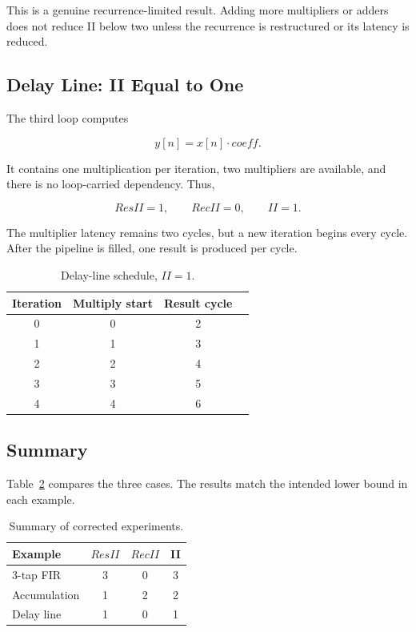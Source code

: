 \documentclass[conference]{IEEEtran}
\begin{document}
This is a genuine recurrence-limited result. Adding more multipliers or adders
does not reduce II below two unless the recurrence is restructured or its latency
is reduced.

\subsection{Delay Line: II Equal to One}

The third loop computes

\begin{equation}
y[n]=x[n]\cdot coeff .
\end{equation}

It contains one multiplication per iteration, two multipliers are available, and
there is no loop-carried dependency. Thus,

\begin{equation}
ResII=1,\qquad RecII=0,\qquad II=1.
\end{equation}

The multiplier latency remains two cycles, but a new iteration begins every cycle.
After the pipeline is filled, one result is produced per cycle.

\begin{table}[t]
\centering
\caption{Delay-line schedule, $II=1$.}
\label{tab:delay}
\begin{tabular}{@{}cccc@{}}
\toprule
Iteration & Multiply start & Result cycle\\
\midrule
0 & 0 & 2\\
1 & 1 & 3\\
2 & 2 & 4\\
3 & 3 & 5\\
4 & 4 & 6\\
\bottomrule
\end{tabular}
\end{table}

\subsection{Summary}

Table~\ref{tab:summary} compares the three cases. The results match the intended
lower bound in each example.


\begin{table}[t]
\centering
\caption{Summary of corrected experiments.}
\label{tab:summary}
\begin{tabular}{@{}lccc@{}}
\toprule
Example & $ResII$ & $RecII$ & II\\
\midrule
3-tap FIR & 3 & 0 & 3\\
Accumulation & 1 & 2 & 2\\
Delay line & 1 & 0 & 1\\
\bottomrule
\end{tabular}
\end{table}
\end{document}
